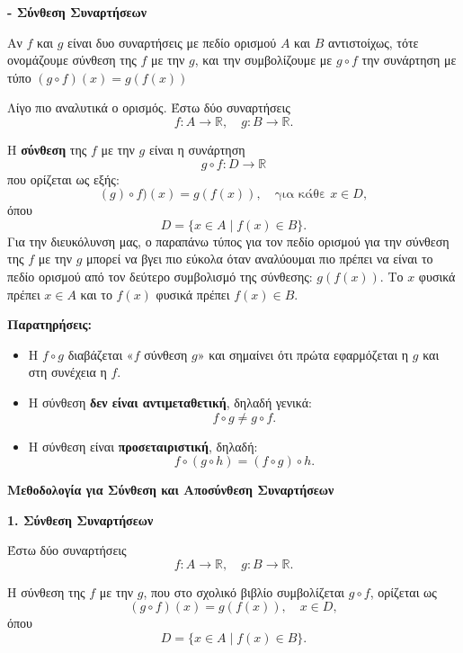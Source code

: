 {\large \textbf{- Σύνθεση Συναρτήσεων}}

\begin{tcolorbox}[colback=blue!10!white, colframe=blue!50!black, title=Ορισμός Σύνθεσης Συναρτήσεων]
Αν $f$ και $g$ είναι δυο συναρτήσεις με πεδίο ορισμού $A$ και $B$ αντιστοίχως, τότε ονομάζουμε σύνθεση της $f$ με την $g$, και την συμβολίζουμε με $g \circ f$ την συνάρτηση με τύπο $(g \circ f)(x) = g(f(x))$
\end{tcolorbox}


Λίγο πιο αναλυτικά ο ορισμός. Έστω δύο συναρτήσεις
\[
f: A \to \mathbb{R}, \quad g: B \to \mathbb{R}.
\]

Η \textbf{σύνθεση} της $f$ με την $g$ είναι η συνάρτηση
\[
g \circ f : D \to \mathbb{R}
\]
που ορίζεται ως εξής:
\[
(g) \circ f)(x) = g(f(x)), \quad \text{για κάθε } x \in D,
\]
όπου
\[
D = \{ x \in A \;|\; f(x) \in B \}.
\]
Για την διευκόλυνση μας, ο παραπάνω τύπος για τον πεδίο ορισμού για την σύνθεση της $f$ με την $g$ μπορεί να βγει πιο εύκολα όταν αναλύουμαι πιο πρέπει να είναι το πεδίο ορισμού από τον δεύτερο συμβολισμό της σύνθεσης: $g(f(x))$. Το $x$ φυσικά πρέπει $x \in A$ και το $f(x)$ φυσικά πρέπει $f(x) \in B$.

\vspace{1em}

\textbf{Παρατηρήσεις:}
\begin{itemize}
  \item Η $f \circ g$ διαβάζεται «$f$ σύνθεση $g$» και σημαίνει ότι πρώτα εφαρμόζεται η $g$ και στη συνέχεια η $f$.
  \item Η σύνθεση \textbf{δεν είναι αντιμεταθετική}, δηλαδή γενικά:
  \[
  f \circ g \neq g \circ f.
  \]
  \item Η σύνθεση είναι \textbf{προσεταιριστική}, δηλαδή:
  \[
  f \circ (g \circ h) = (f \circ g) \circ h.
  \]
\end{itemize}

{\large \textbf{Μεθοδολογία για Σύνθεση και Αποσύνθεση Συναρτήσεων}}
\vspace{1em}

\textbf{1. Σύνθεση Συναρτήσεων}

Έστω δύο συναρτήσεις
\[
f: A \to \mathbb{R}, \quad g: B \to \mathbb{R}.
\]

Η σύνθεση της $f$ με την $g$, που στο σχολικό βιβλίο συμβολίζεται $g \circ f$, ορίζεται ως
\[
(g \circ f)(x) = g(f(x)), \quad x \in D,
\]
όπου
\[
D = \{ x \in A \mid f(x) \in B \}.
\]

\vspace{0.5em}

